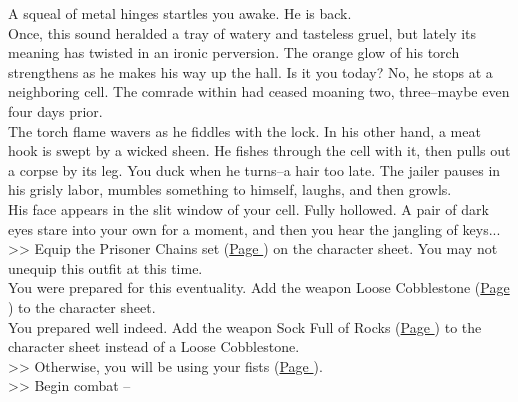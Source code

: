 A squeal of metal hinges startles you awake. He is back.\\

Once, this sound heralded a tray of watery and tasteless gruel, but lately its meaning has twisted in an ironic perversion. The orange glow of his torch strengthens as he makes his way up the hall. Is it you today? No, he stops at a neighboring cell. The comrade within had ceased moaning two, three--maybe even four days prior.\\

The torch flame wavers as he fiddles with the lock. In his other hand, a meat hook is swept by a wicked sheen. He fishes through the cell with it, then pulls out a corpse by its leg. You duck when he turns--a hair too late. The jailer pauses in his grisly labor, mumbles something to himself, laughs, and then growls.\\

His face appears in the slit window of your cell. Fully hollowed. A pair of dark eyes stare into your own for a moment, and then you hear the jangling of keys...\\

>> Equip the Prisoner Chains set (\hyperlink{Prisoner Chains}{Page \pageref{Prisoner Chains}}) on the character sheet. You may not unequip this outfit at this time.\\
 You were prepared for this eventuality. Add the weapon Loose Cobblestone (\hyperlink{Loose Cobblestone}{Page \pageref{Loose Cobblestone}}) to the character sheet.\\
 You prepared well indeed. Add the weapon Sock Full of Rocks (\hyperlink{Sock Full of Rocks}{Page \pageref{Sock Full of Rocks}}) to the character sheet instead of a Loose Cobblestone.\\
>> Otherwise, you will be using your fists (\hyperlink{Fist}{Page \pageref{Fist}}).\\

>> Begin combat -- 
